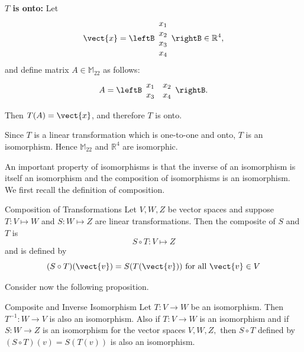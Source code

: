 \begin{solution}
\textbf{$T$ is onto:}
Let
\[ \vect{x}=\leftB\begin{array}{c} x_1\\x_2\\x_3\\x_4 \end{array}\rightB\in\mathbb{R}^4,\]
and
define matrix $A\in\mathbb{M}_{22}$ as follows:
\[ A=\leftB\begin{array}{cc} x_1 & x_2 \\ x_3 & x_4 \end{array}\rightB.\]

Then $T(A)=\vect{x}$, and therefore $T$ is onto.

Since $T$ is a linear transformation which is one-to-one and onto, $T$ is an isomorphism. Hence $\mathbb{M}_{22}$ and $\mathbb{R}^4$ are isomorphic.
\end{solution}

An important property of isomorphisms is that the inverse of an isomorphism
is itself an isomorphism and the composition of isomorphisms is an
isomorphism. We first recall the definition of composition.

\begin{definition}{Composition of Transformations}\label{def:compositetransformation}
Let $V, W, Z$ be vector spaces and suppose $T: V \mapsto W$ and $S: W \mapsto Z$ are linear transformations. Then the composite of $S$ and $T$ is
\[
S \circ T: V \mapsto Z
\]
and is defined by 
\[
(S \circ T) (\vect{v}) = S(T(\vect{v})) \mbox{ for all } \vect{v} \in V
\]
\end{definition}

Consider now the following proposition.

\begin{proposition}{Composite and Inverse Isomorphism}\label{prop:compositeinverse}
Let $T:V\rightarrow W$ be an isomorphism. Then $T^{-1}:W\rightarrow V$ is
also an isomorphism. Also if $T:V\rightarrow W$ is an isomorphism and if $
S:W\rightarrow Z$ is an isomorphism for the vector spaces $V,W,Z,$ then $
S\circ T$ defined by $\left( S\circ T\right) \left( v\right) = S\left(
T\left( v\right) \right) $ is also an isomorphism.
\end{proposition}

